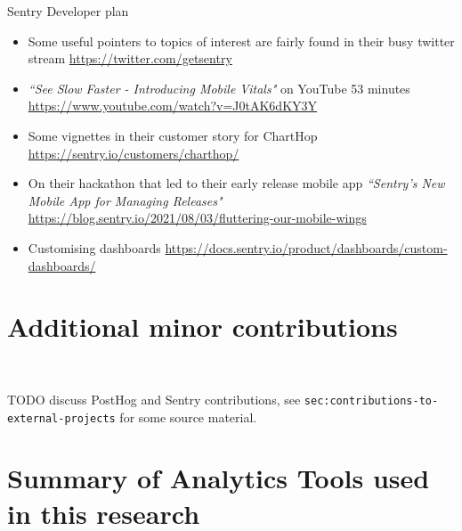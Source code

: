 Sentry Developer plan 

\begin{itemize}
    \item Some useful pointers to topics of interest are fairly found in their busy twitter stream \url{https://twitter.com/getsentry}
    \item \emph{``See Slow Faster - Introducing Mobile Vitals"} on YouTube 53 minutes \url{https://www.youtube.com/watch?v=J0tAK6dKY3Y}
    \item Some vignettes in their customer story for ChartHop \url{https://sentry.io/customers/charthop/}
    \item On their hackathon that led to their early release mobile app \emph{``Sentry's New Mobile App for Managing Releases"}  \url{https://blog.sentry.io/2021/08/03/fluttering-our-mobile-wings}
    \item Customising dashboards \url{https://docs.sentry.io/product/dashboards/custom-dashboards/}
\end{itemize}

\section{Additional minor contributions}~\label{tools-minor-contributions}

TODO discuss PostHog and Sentry contributions, see \texttt{sec:contributions-to-external-projects} for some source material.

\section{Summary of Analytics Tools used in this research}
